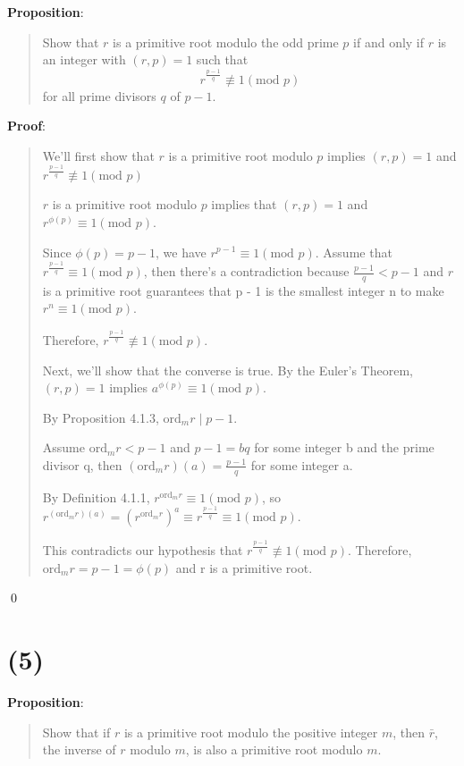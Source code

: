 \documentclass{article} %
\begin{document}
\bigskip
\noindent
\textbf{Proposition}:
\begin{quote}
    Show that $r$ is a primitive root modulo the odd prime $p$ if and only if $r$ is an integer with $(r, p) = 1$ such that
    \[r^{\frac{p-1}{q}} \not\equiv 1 (\text{mod }p)\]
    for all prime divisors $q$ of $p - 1$.
\end{quote}

\bigskip
\noindent
\textbf{Proof}:
\begin{quote}
    We'll first show that $r$ is a primitive root modulo $p$ implies $(r, p) = 1$ and $r^{\frac{p-1}{q}} \not\equiv 1 (\text{mod }p)$

    $r$ is a primitive root modulo $p$ implies that $(r, p) = 1$ and $r^{\phi(p)} \equiv 1 (\text{mod }p)$.

    Since $\phi(p) = p - 1$, we have $r^{p-1} \equiv 1(\text{mod }p)$.
    Assume that $r^{\frac{p-1}{q}} \equiv 1 (\text{mod }p)$, then there's a contradiction because $\frac{p-1}{q} < p-1$ and $r$ is a primitive root guarantees that p - 1 is the smallest integer n to make $r^{n} \equiv 1 (\text{mod }p)$.

    Therefore, $r^{\frac{p-1}{q}} \not\equiv 1 (\text{mod }p)$.

    \bigskip
    Next, we'll show that the converse is true.
    By the Euler's Theorem, $(r, p) = 1$ implies $a^{\phi(p)} \equiv 1 (\text{mod }p)$.

    By Proposition 4.1.3, $\text{ord}_m r \mid p - 1$.

    Assume $\text{ord}_m r < p - 1$ and $p - 1 = bq$ for some integer b and the prime divisor q, then $(\text{ord}_m r )(a) = \frac{p - 1}{q}$ for some integer a.

    By Definition 4.1.1, $r^{\text{ord}_m r} \equiv 1 (\text{mod }p)$, so $r^{(\text{ord}_m r)(a)} = (r^{\text{ord}_m r})^a \equiv r^{\frac{p-1}{q}}\equiv 1 (\text{mod }p)$.

    This contradicts our hypothesis that $r^{\frac{p-1}{q}} \not\equiv 1 (\text{mod }p)$. Therefore, $\text{ord}_m r = p - 1 = \phi(p)$ and r is a primitive root.
\end{quote}

\qed
\bigskip

\section*{(5)}

\bigskip
\noindent
\textbf{Proposition}:
\begin{quote}
    Show that if $r$ is a primitive root modulo the positive integer $m$, then $\bar{r}$, the inverse of $r$ modulo $m$, is also a primitive root modulo $m$.
\end{quote}
\end{document}
